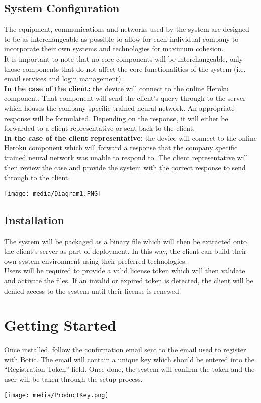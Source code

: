 \documentclass[11pt]{article}
\begin{document}
\subsection{System Configuration}
\begin{flushleft}
	The equipment, communications and networks used by the system are designed to be as interchangeable as possible to allow for each individual company to incorporate their own systems and technologies for maximum cohesion.\\[0.5cm]
	It is important to note that no core components will be interchangeable, only those components that do not affect the core functionalities of the system (i.e. email services and login management).\\[0.5cm]
	\textbf{In the case of the client:} the device will connect to the online Heroku component. That component will send the client's query through to the server which houses the company specific trained neural network. An appropriate response will be formulated. Depending on the response, it will either be forwarded to a client representative or sent back to the client.\\[0.5cm]
	\textbf{In the case of the client representative:} the device will connect to the online Heroku component which will forward a response that the company specific trained neural network was unable to respond to. The client representative will then review the case and provide the system with the correct response to send through to the client.\\[0.5cm]
\end{flushleft}
\texttt{[image: media/Diagram1.PNG]}

\subsection{Installation}
\begin{flushleft}
	The system will be packaged as a binary file which will then be extracted onto the client's server as part of deployment. In this way, the client can build their own system environment using their preferred technologies.\\[0.5cm]
	Users will be required to provide a valid license token which will then validate and activate the files. If an invalid or expired token is detected, the client will be denied access to the system until their license is renewed.\\[0.5cm]
\end{flushleft}
\section {Getting Started}
\begin{flushleft}
	Once installed, follow the confirmation email sent to the email used to register with Botic. The email will contain a unique key which should be entered into the “Registration Token” field. Once done, the system will confirm the token and the user will be taken through the setup process.
\end{flushleft}
\texttt{[image: media/ProductKey.png]}
\end{document}
